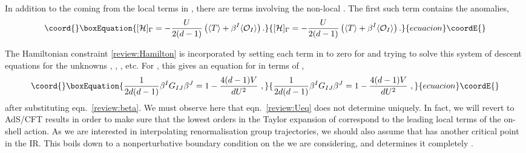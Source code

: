 \documentclass[a4paper,12pt]{article}
\begin{document}
In addition to the \coordHE{} coming from the local terms in
\coordHE{}, there are terms involving the non-local \myHighlight{$\Gamma$}\coordHE{}. The first
such term contains the anomalies,
\begin{equation}\coord{}\boxEquation{
\label{review:Hd}
  [\mathcal{H}]_\Gamma = -\frac{U}{2(d-1)} \left( \langle T\rangle +\beta^I
  \langle \mathcal{O}_I \rangle \right).
}{
[\mathcal{H}]_\Gamma = -\frac{U}{2(d-1)} \left( \langle T\rangle +\beta^I
  \langle \mathcal{O}_I \rangle \right).
}{ecuacion}\coordE{}\end{equation}

The Hamiltonian constraint \eqref{review:Hamilton} is incorporated by
setting each term in \coordHE{} to zero for \coordHE{} and
trying to solve this system of descent equations for the unknowns 
\coordHE{}, \myHighlight{$\Phi$}\coordHE{}, \coordHE{}, etc. For \coordHE{}, this gives an equation for \coordHE{}
in terms of \coordHE{}, 
\begin{equation}\coord{}\boxEquation{
\label{review:Ueq}
  \frac1{2d(d-1)} \beta^I G_{IJ} \beta^J = 1 - \frac{4(d-1)V}{dU^2}~,
}{
\frac1{2d(d-1)} \beta^I G_{IJ} \beta^J = 1 - \frac{4(d-1)V}{dU^2}~,
}{ecuacion}\coordE{}\end{equation}
after substituting eqn.\ \eqref{review:beta}. We must observe here
that eqn.\ \eqref{review:Ueq} does not determine \coordHE{} uniquely. In
fact, we will revert to AdS/CFT results in order to make sure that the lowest
orders in the Taylor expansion of \coordHE{} correspond to the leading local terms of
the on-shell action. 
As we are interested in interpolating renormalisation group trajectories, we
should also assume that \coordHE{} has another critical point in the IR. This 
boils down to a nonperturbative boundary condition on the \coordHE{} we are 
considering, and determines it completely \cite{Campos00}.
\end{document}
